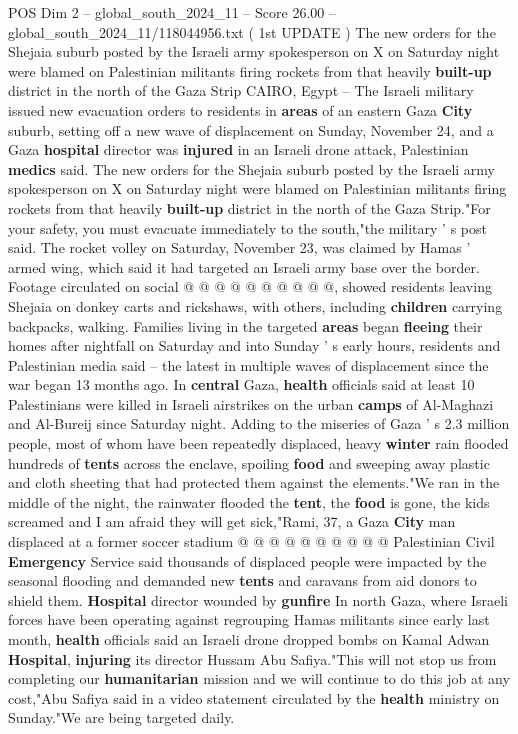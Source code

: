 \begin{textsample}{POS Dim 2 – global\_south\_2024\_11 – Score 26.00 – global\_south\_2024\_11/118044956.txt}  \label{ex:f2_pos_245}
( 1st UPDATE ) The new orders for the Shejaia suburb posted by the Israeli army spokesperson on X on Saturday night were blamed on Palestinian militants firing rockets from that heavily \textbf{built-up} district in the north of the Gaza Strip CAIRO, Egypt -- The Israeli military issued new evacuation orders to residents in \textbf{areas} of an eastern Gaza \textbf{City} suburb, setting off a new wave of displacement on Sunday, November 24, and a Gaza \textbf{hospital} director was \textbf{injured} in an Israeli drone attack, Palestinian \textbf{medics} said.
The new orders for the Shejaia suburb posted by the Israeli army spokesperson on X on Saturday night were blamed on Palestinian militants firing rockets from that heavily \textbf{built-up} district in the north of the Gaza Strip."For your safety, you must evacuate immediately to the south,"the military ' s post said.
The rocket volley on Saturday, November 23, was claimed by Hamas ' armed wing, which said it had targeted an Israeli army base over the border.
Footage circulated on social @ @ @ @ @ @ @ @ @ @, showed residents leaving Shejaia on donkey carts and rickshaws, with others, including \textbf{children} carrying backpacks, walking.
Families living in the targeted \textbf{areas} began \textbf{fleeing} their homes after nightfall on Saturday and into Sunday ' s early hours, residents and Palestinian media said -- the latest in multiple waves of displacement since the war began 13 months ago.
In \textbf{central} Gaza, \textbf{health} officials said at least 10 Palestinians were killed in Israeli airstrikes on the urban \textbf{camps} of Al-Maghazi and Al-Bureij since Saturday night.
Adding to the miseries of Gaza ' s 2.3 million people, most of whom have been repeatedly displaced, heavy \textbf{winter} rain flooded hundreds of \textbf{tents} across the enclave, spoiling \textbf{food} and sweeping away plastic and cloth sheeting that had protected them against the elements."We ran in the middle of the night, the rainwater flooded the \textbf{tent}, the \textbf{food} is gone, the kids screamed and I am afraid they will get sick,"Rami, 37, a Gaza \textbf{City} man displaced at a former soccer stadium @ @ @ @ @ @ @ @ @ @ Palestinian Civil \textbf{Emergency} Service said thousands of displaced people were impacted by the seasonal flooding and demanded new \textbf{tents} and caravans from aid donors to shield them. \textbf{Hospital} director wounded by \textbf{gunfire} In north Gaza, where Israeli forces have been operating against regrouping Hamas militants since early last month, \textbf{health} officials said an Israeli drone dropped bombs on Kamal Adwan \textbf{Hospital}, \textbf{injuring} its director Hussam Abu Safiya."This will not stop us from completing our \textbf{humanitarian} mission and we will continue to do this job at any cost,"Abu Safiya said in a video statement circulated by the \textbf{health} ministry on Sunday."We are being targeted daily.

\end{textsample}
